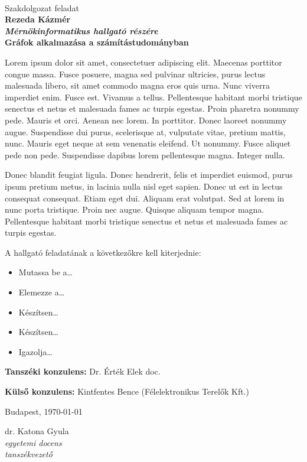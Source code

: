 \documentclass[12pt,a4paper]{article}
\begin{document}
 \ \
\vspace{2mm}
\begin{center}
{\Large\sc
Szakdolgozat feladat\\[5mm]
\bf 
Rezeda Kázmér
\\
{\it\normalsize 
Mérnökinformatikus hallgató részére
}\\[10mm]
\Large \vfill
Gráfok alkalmazása a számítástudományban
}
\end{center}
\vspace{1cm}

Lorem ipsum dolor sit amet, consectetuer adipiscing elit. Maecenas porttitor congue massa. Fusce posuere, magna sed pulvinar ultricies, purus lectus malesuada libero, sit amet commodo magna eros quis urna. Nunc viverra imperdiet enim. Fusce est. Vivamus a tellus. Pellentesque habitant morbi tristique senectus et netus et malesuada fames ac turpis egestas. Proin pharetra nonummy pede. Mauris et orci.
Aenean nec lorem. In porttitor. Donec laoreet nonummy augue. Suspendisse dui purus, scelerisque at, vulputate vitae, pretium mattis, nunc. Mauris eget neque at sem venenatis eleifend. Ut nonummy. Fusce aliquet pede non pede. Suspendisse dapibus lorem pellentesque magna. Integer nulla.

Donec blandit feugiat ligula. Donec hendrerit, felis et imperdiet euismod, purus ipsum pretium metus, in lacinia nulla nisl eget sapien. Donec ut est in lectus consequat consequat. Etiam eget dui. Aliquam erat volutpat. Sed at lorem in nunc porta tristique. Proin nec augue. Quisque aliquam tempor magna. Pellentesque habitant morbi tristique senectus et netus et malesuada fames ac turpis egestas.

A hallgató feladatának a következőkre kell kiterjednie:

\begin{itemize}
\item Mutassa be a…
\item Elemezze a…
\item Készítsen…
\item Készítsen…	
\item Igazolja…
\end{itemize}

\textbf{Tanszéki konzulens:}	Dr. Érték Elek doc.

\textbf{Külső konzulens:}	Kintfentes Bence (Félelektronikus Terelők Kft.)


\vspace{1cm}\vfill
Budapest, \today
\begin{flushright}
\begin{minipage}{0.5\textwidth}
\begin{center}
	dr. Katona Gyula\\
	\textit{egyetemi docens}\\
	\textit{tanszékvezető}
\end{center}
\end{minipage}
\end{flushright}
\vfill
\end{document}
